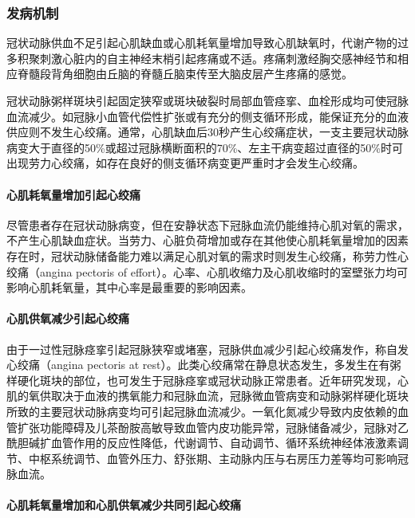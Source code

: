 \subsubsection{发病机制}

冠状动脉供血不足引起心肌缺血或心肌耗氧量增加导致心肌缺氧时，代谢产物的过多积聚刺激心脏内的自主神经末梢引起疼痛或不适。疼痛刺激经胸交感神经节和相应脊髓段背角细胞由丘脑的脊髓丘脑束传至大脑皮层产生疼痛的感觉。

冠状动脉粥样斑块引起固定狭窄或斑块破裂时局部血管痉挛、血栓形成均可使冠脉血流减少。如冠脉小血管代偿性扩张或有充分的侧支循环形成，能保证充分的血液供应则不发生心绞痛。通常，心肌缺血后30秒产生心绞痛症状，一支主要冠状动脉病变大于直径的50\%或超过冠脉横断面积的70\%、左主干病变超过直径的50\%时可出现劳力心绞痛，如存在良好的侧支循环病变更严重时才会发生心绞痛。

\paragraph{心肌耗氧量增加引起心绞痛}

尽管患者存在冠状动脉病变，但在安静状态下冠脉血流仍能维持心肌对氧的需求，不产生心肌缺血症状。当劳力、心脏负荷增加或存在其他使心肌耗氧量增加的因素存在时，冠状动脉储备能力难以满足心肌对氧的需求时则发生心绞痛，称劳力性心绞痛（angina
pectoris of
effort）。心率、心肌收缩力及心肌收缩时的室壁张力均可影响心肌耗氧量，其中心率是最重要的影响因素。

\paragraph{心肌供氧减少引起心绞痛}

由于一过性冠脉痉挛引起冠脉狭窄或堵塞，冠脉供血减少引起心绞痛发作，称自发心绞痛（angina
pectoris at
rest）。此类心绞痛常在静息状态发生，多发生在有粥样硬化斑块的部位，也可发生于冠脉痉挛或冠状动脉正常患者。近年研究发现，心肌的氧供取决于血液的携氧能力和冠脉血流，冠脉微血管病变和动脉粥样硬化斑块所致的主要冠状动脉病变均可引起冠脉血流减少。一氧化氮减少导致内皮依赖的血管扩张功能障碍及儿茶酚胺高敏导致血管内皮功能异常，冠脉储备减少，冠脉对乙酰胆碱扩血管作用的反应性降低，代谢调节、自动调节、循环系统神经体液激素调节、中枢系统调节、血管外压力、舒张期、主动脉内压与右房压力差等均可影响冠脉血流。

\paragraph{心肌耗氧量增加和心肌供氧减少共同引起心绞痛}

